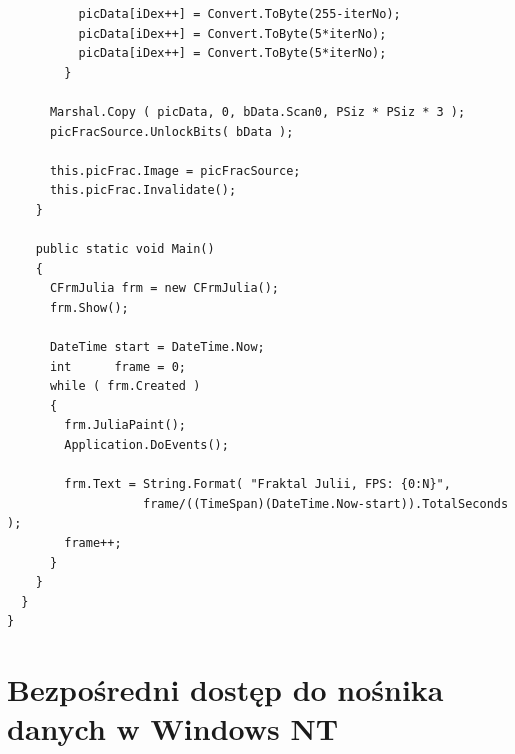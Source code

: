 \begin{scriptsize}
\begin{verbatim}
          picData[iDex++] = Convert.ToByte(255-iterNo);
          picData[iDex++] = Convert.ToByte(5*iterNo);
          picData[iDex++] = Convert.ToByte(5*iterNo);
        }

      Marshal.Copy ( picData, 0, bData.Scan0, PSiz * PSiz * 3 ); 
      picFracSource.UnlockBits( bData );

      this.picFrac.Image = picFracSource; 
      this.picFrac.Invalidate();
    }

    public static void Main()
    {
      CFrmJulia frm = new CFrmJulia(); 
      frm.Show();
  
      DateTime start = DateTime.Now;
      int      frame = 0;
      while ( frm.Created )
      {
        frm.JuliaPaint();
        Application.DoEvents();

        frm.Text = String.Format( "Fraktal Julii, FPS: {0:N}", 
                   frame/((TimeSpan)(DateTime.Now-start)).TotalSeconds );      
        frame++;
      } 
    }
  }
}
\end{verbatim}
\end{scriptsize}

\section{Bezpośredni dostęp do nośnika danych w Windows NT}

